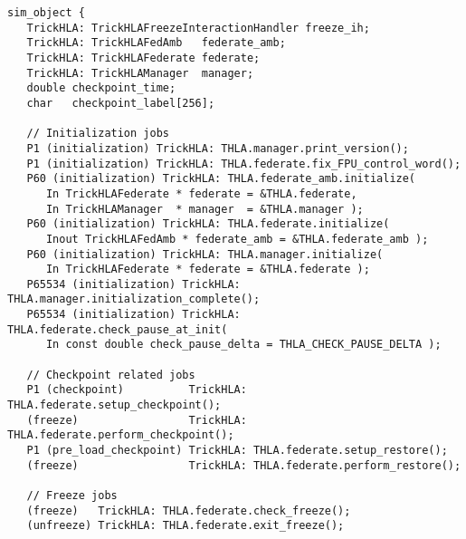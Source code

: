 \begin{lstlisting}[caption={The {\tt THLA sim\_object}},label={list:THLA-sim-object}]
sim_object {
   TrickHLA: TrickHLAFreezeInteractionHandler freeze_ih;
   TrickHLA: TrickHLAFedAmb   federate_amb;
   TrickHLA: TrickHLAFederate federate;
   TrickHLA: TrickHLAManager  manager;
   double checkpoint_time;
   char   checkpoint_label[256];

   // Initialization jobs
   P1 (initialization) TrickHLA: THLA.manager.print_version();
   P1 (initialization) TrickHLA: THLA.federate.fix_FPU_control_word();
   P60 (initialization) TrickHLA: THLA.federate_amb.initialize(
      In TrickHLAFederate * federate = &THLA.federate,
      In TrickHLAManager  * manager  = &THLA.manager );
   P60 (initialization) TrickHLA: THLA.federate.initialize(
      Inout TrickHLAFedAmb * federate_amb = &THLA.federate_amb );
   P60 (initialization) TrickHLA: THLA.manager.initialize(
      In TrickHLAFederate * federate = &THLA.federate );
   P65534 (initialization) TrickHLA: THLA.manager.initialization_complete();
   P65534 (initialization) TrickHLA: THLA.federate.check_pause_at_init( 
      In const double check_pause_delta = THLA_CHECK_PAUSE_DELTA );

   // Checkpoint related jobs
   P1 (checkpoint)          TrickHLA: THLA.federate.setup_checkpoint();
   (freeze)                 TrickHLA: THLA.federate.perform_checkpoint();
   P1 (pre_load_checkpoint) TrickHLA: THLA.federate.setup_restore();
   (freeze)                 TrickHLA: THLA.federate.perform_restore();

   // Freeze jobs
   (freeze)   TrickHLA: THLA.federate.check_freeze();
   (unfreeze) TrickHLA: THLA.federate.exit_freeze();


\end{lstlisting}
